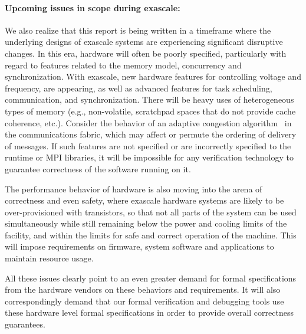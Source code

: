 \paragraph{Upcoming issues in scope during exascale:}
We also realize that
this report is being written in a timeframe where the underlying designs of exascale systems are experiencing significant disruptive changes.
%
In this era, hardware will often be poorly specified, particularly with regard to features related to
the memory model, concurrency and synchronization.  With exascale, new hardware features
for controlling voltage and frequency, are appearing, as well as advanced features for
task scheduling, communication, and synchronization. 
%
There will be heavy uses of heterogeneous types of memory (e.g., non-volatile, scratchpad spaces that do not provide cache coherence, etc.).
%
Consider the behavior
of an adaptive congestion algorithm~\cite{jiang2009indirect} in the communications fabric, which may 
affect or permute the ordering of delivery of messages. If such features are
not specified or are incorrectly specified to the runtime or MPI libraries, it will be impossible for any verification technology to guarantee correctness of the software running on it.  



The performance behavior of hardware is also moving into the arena
of correctness and even safety, where exascale hardware systems are likely to be
over-provisioned with transistors, so that not all 
parts of the system can be used simultaneously while still remaining below
the power and cooling limits of the facility, and within the limits for safe and correct operation of the machine.  This will impose requirements
on firmware, system software and applications to maintain resource usage.  

All these
issues clearly point to an even greater 
demand for formal specifications from the hardware
vendors on these behaviors and requirements.
It will also correspondingly demand that our formal verification
and debugging tools use these hardware level formal specifications in order to provide overall correctness guarantees.

   

     


 

